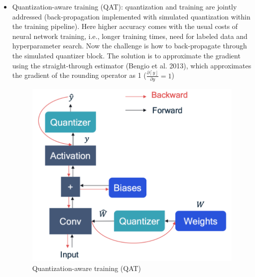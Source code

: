 \documentclass{article}
\begin{document}
\begin{itemize}
          \item Quantization-aware training (QAT): quantization and training are jointly addressed (back-propagation implemented with simulated quantization within the training pipeline). Here higher accuracy comes with the usual costs of neural network training,
          i.e., longer training times, need for labeled data and hyperparameter search. Now the challenge is how to back-propagate through the simulated quantizer block. The solution is to approximate the gradient using the straight-through
          estimator (Bengio et al. 2013), which approximates the gradient of the rounding operator as 1 ($\frac{\partial \left\lceil  y\right\rfloor }{\partial y} = 1$)
          \begin{figure}[H]
            \includegraphics[scale=0.3]{../Images/QAT.png}
            \centering
            \caption{Quantization-aware training (QAT)}
          \end{figure}
        \end{itemize}
\end{document}
